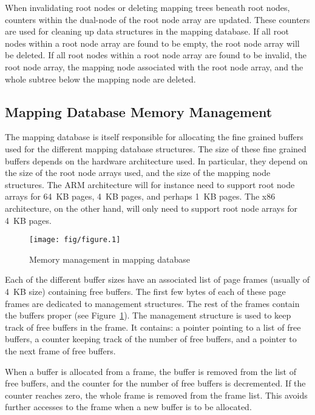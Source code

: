 \documentclass[a4paper,twoside]{book}
\begin{document}
When invalidating root nodes or deleting mapping trees beneath root
nodes, counters within the dual-node of the root node array are
updated.  These counters are used for cleaning up data structures in
the mapping database.  If all root nodes within a root node array are
found to be empty, the root node array will be deleted.  If all root
nodes within a root node array are found to be invalid, the root node
array, the mapping node associated with the root node array, and the
whole subtree below the mapping node are deleted.


\subsection{Mapping Database Memory Management}

The mapping database is itself responsible for allocating the fine
grained buffers used for the different mapping database structures.
The size of these fine grained buffers depends on the hardware
architecture used.  In particular, they depend on the size of the root
node arrays used, and the size of the mapping node structures.  The
ARM architecture will for instance need to support root node arrays
for 64~KB pages, 4~KB pages, and perhaps 1~KB pages.  The x86
architecture, on the other hand, will only need to support root node
arrays for 4~KB pages.

\begin{figure}[tbp]
  \begin{center}
    \texttt{[image: fig/figure.1]}
    \caption{Memory management in mapping database}
    \label{fig:mdb-mem}
  \end{center}
\end{figure}

Each of the different buffer sizes have an associated list of page
frames (usually of 4~KB size) containing free buffers.  The first few
bytes of each of these page frames are dedicated to management
structures.  The rest of the frames contain the buffers proper (see
Figure~\ref{fig:mdb-mem}).  The management structure is used to keep
track of free buffers in the frame.  It contains: a pointer pointing
to a list of free buffers, a counter keeping track of the number of
free buffers, and a pointer to the next frame of free buffers.

When a buffer is allocated from a frame, the buffer is removed from
the list of free buffers, and the counter for the number of free
buffers is decremented.  If the counter reaches zero, the whole frame
is removed from the frame list.  This avoids further accesses to the
frame when a new buffer is to be allocated.
\end{document}
